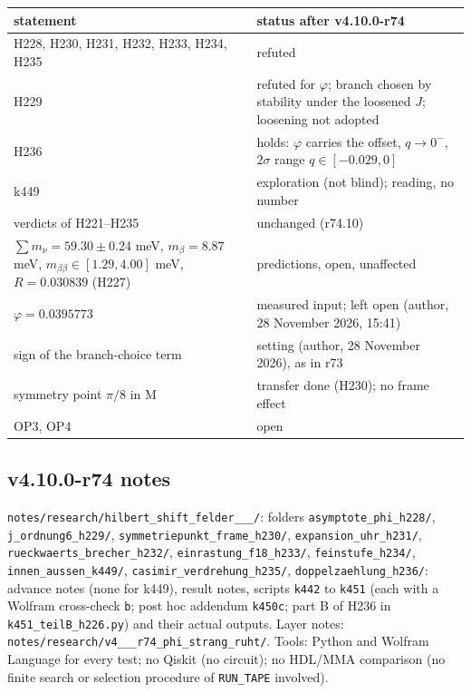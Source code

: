 \begin{center}
\small
\begin{tabular}{@{}>{\raggedright\arraybackslash}p{}>{\raggedright\arraybackslash}p{}@{}}
\toprule
statement & status after v4.10.0-r74\\
\midrule
H228, H230, H231, H232, H233, H234, H235 & refuted\\
H229 & refuted for \(\varphi\); branch chosen by stability under the loosened \(J\); loosening not adopted\\
H236 & holds: \(\varphi\) carries the offset, \(q\to0^-\), \(2\sigma\) range \(q\in[-0.029,0]\)\\
k449 & exploration (not blind); reading, no number\\
verdicts of H221--H235 & unchanged (r74.10)\\
\(\sum m_\nu=59.30\pm0.24\) meV, \(m_\beta=8.87\) meV, \(m_{\beta\beta}\in[1.29,4.00]\) meV, \(R=0.030839\) (H227) & predictions, open, unaffected\\
\(\varphi=0.0395773\) & measured input; left open (author, 28 November 2026, 15:41)\\
sign of the branch-choice term & setting (author, 28 November 2026), as in r73\\
symmetry point \(\pi/8\) in M & transfer done (H230); no frame effect\\
OP3, OP4 & open\\
\bottomrule
\end{tabular}
\end{center}

\subsection*{v4.10.0-r74 notes}
\label{subsec:v4100-r74-notes}

{\raggedright
\texttt{notes/\allowbreak research/\allowbreak hilbert\_\allowbreak shift\_\allowbreak felder\_\_\_/}: folders
\texttt{asymptote\_\allowbreak phi\_\allowbreak h228/}, \texttt{j\_\allowbreak ordnung6\_\allowbreak h229/}, \texttt{symmetriepunkt\_\allowbreak frame\_\allowbreak h230/},
\texttt{expansion\_\allowbreak uhr\_\allowbreak h231/}, \texttt{rueckwaerts\_\allowbreak brecher\_\allowbreak h232/}, \texttt{einrastung\_\allowbreak f18\_\allowbreak h233/},
\texttt{feinstufe\_\allowbreak h234/}, \texttt{innen\_\allowbreak aussen\_\allowbreak k449/}, \texttt{casimir\_\allowbreak verdrehung\_\allowbreak h235/},
\texttt{doppelzaehlung\_\allowbreak h236/}: advance notes (none for k449), result notes, scripts \texttt{k442} to \texttt{k451} (each with a Wolfram
cross-check \texttt{b}; post hoc addendum \texttt{k450c}; part B of H236 in \texttt{k451\_\allowbreak teilB\_\allowbreak h226.py}) and their actual outputs.
Layer notes: \texttt{notes/\allowbreak research/\allowbreak v4\_\_\_\allowbreak r74\_\allowbreak phi\_\allowbreak strang\_\allowbreak ruht/}.
Tools: Python and Wolfram Language for every test; no Qiskit (no circuit); no HDL/MMA comparison (no finite search or selection procedure
of \texttt{RUN\_TAPE} involved).
\par}

